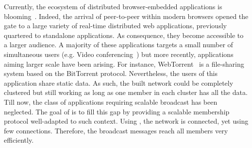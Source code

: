 Currently, the ecosystem of distributed browser-embedded applications is
blooming~\cite{firefoxhello, sharefest, webtorrent}. Indeed, the arrival of
peer-to-peer within modern browsers opened the gate to a large variety of
real-time distributed web applications, previously quartered to standalone
applications. As consequence, they become accessible to a larger audience. A
majority of these applications targets a small number of simultaneous users
(e.g. Video conferencing~\cite{firefoxhello}) but more recently, applications
aiming larger scale have been arising. For instance,
WebTorrent~\cite{webtorrent} is a file-sharing system based on the BitTorrent
protocol. Nevertheless, the users of this application share static data. As
such, the built network could be completely clustered but still working as long
as one member in each cluster has all the data.  Till now, the class of
applications requiring scalable broadcast has been neglected. The goal of
\SCAMPLON{} is to fill this gap by providing a scalable membership protocol
well-adapted to such context. Using \SCAMPLON{}, the network is connected, yet
using few connections. Therefore, the broadcast messages reach all members very
efficiently.


